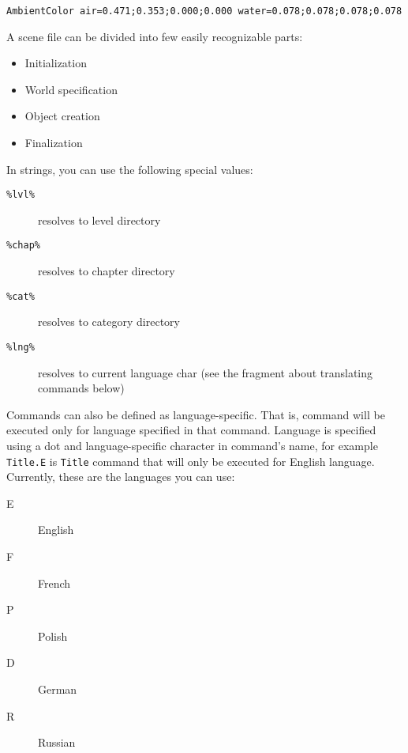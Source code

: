 \begin{lstlisting}[style=scene]
AmbientColor air=0.471;0.353;0.000;0.000 water=0.078;0.078;0.078;0.078
\end{lstlisting}

A scene file can be divided into few easily recognizable parts:

\begin{itemize}
    \item Initialization
    \item World specification
    \item Object creation
    \item Finalization
\end{itemize}

In strings, you can use the following special values:

\begin{description}
    \item[\texttt{\%lvl\%}] resolves to level directory
    \item[\texttt{\%chap\%}] resolves to chapter directory
    \item[\texttt{\%cat\%}] resolves to category directory
    \item[\texttt{\%lng\%}] resolves to current language char (see the fragment about translating commands below)
\end{description}

Commands can also be defined as language-specific. That is, command will be executed only for language specified in that command. Language is specified using a dot and language-specific character in command's name, for example \texttt{Title.E} is \texttt{Title} command that will only be executed for English language. Currently, these are the languages you can use:

\begin{description}
    \item[E] English
    \item[F] French
    \item[P] Polish
    \item[D] German
    \item[R] Russian
\end{description}

